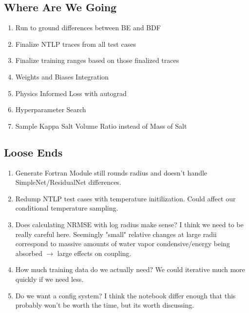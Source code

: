 \documentclass{article}
\begin{document}
\subsection{Where Are We Going}
\begin{enumerate}
	\item Run to ground differences between BE and BDF
	\item Finalize NTLP traces from all test cases
	\item Finalize training ranges based on those finalized traces
	\item Weights and Biases Integration
	\item Physics Informed Loss with autograd
	\item Hyperparameter Search
	\item Sample Kappa Salt Volume Ratio instead of Mass of Salt
\end{enumerate}
\subsection{Loose Ends}
\begin{enumerate}
	\item Generate Fortran Module still rounds radius and doesn't handle SimpleNet/ResidualNet differences.
	\item Redump NTLP test cases with temperature initilization. Could affect our conditional temperature sampling.
	\item Does calculating NRMSE with log radius make sense? I think we need to be really careful here. Seemingly "small" relative changes at large radii correspond to massive amounts of water vapor condensive/energy being absorbed $\rightarrow$ large effects on coupling.
	\item How much training data do we actually need? We could iterative much more quickly if we need less.
	\item Do we want a config system? I think the notebook differ enough that this probably won't be worth the time, but its worth discussing.
\end{enumerate}
\end{document}

